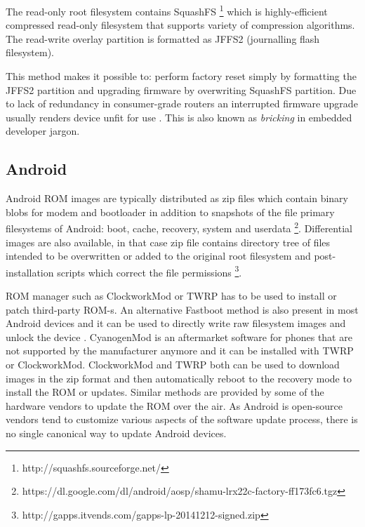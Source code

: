 \documentclass[a4paper,11pt]{kth-mag}
\begin{document}
The read-only root filesystem contains SquashFS
\footnote{http://squashfs.sourceforge.net/}
which is highly-efficient compressed read-only filesystem that
supports variety of compression algorithms.
The read-write overlay partition
is formatted as JFFS2 (journalling flash filesystem).

This method makes it possible to: perform factory reset simply by
formatting the JFFS2 partition and upgrading firmware by overwriting
SquashFS partition. Due to lack of redundancy in consumer-grade routers
an interrupted firmware upgrade usually renders device unfit for use
\cite{building-murphy-compatible-embedded-linux-systems}
\cite{safe-upgrade-of-embedded-systems}.
This is also known as \emph{bricking} in embedded developer jargon.


\cite{software-update-scheme-by-airwaves}

\subsection{Android}

Android ROM images are typically distributed as zip files which contain
binary blobs for modem and bootloader in addition to snapshots of the
file primary filesystems of Android: boot, cache, recovery, system and
userdata
\footnote{https://dl.google.com/dl/android/aosp/shamu-lrx22c-factory-ff173fc6.tgz}.
Differential images are also available, in that case zip file contains
directory tree of files intended to be overwritten or added to the original
root filesystem and post-installation scripts which correct the file permissions
\footnote{http://gapps.itvends.com/gapps-lp-20141212-signed.zip}.

ROM manager such as ClockworkMod \cite{clockworkmod} or
TWRP \cite{twrp} has to be used to install or patch
third-party ROM-s.
An alternative Fastboot method is also present in most
Android devices and it can be used to directly write raw filesystem images and
unlock the device
\cite{fastboot}.
CyanogenMod is an aftermarket software for phones that are not
supported by the manufacturer anymore and it can
be installed with TWRP or ClockworkMod.
ClockworkMod and TWRP both can be used to download
images in the zip format and then
automatically reboot to the recovery mode to install the
ROM or updates.
Similar methods are provided by some of the hardware
vendors to update the ROM over the air.
As Android is open-source vendors tend to customize various aspects
of the software update process, there is no single canonical
way to update Android devices.
\end{document}
